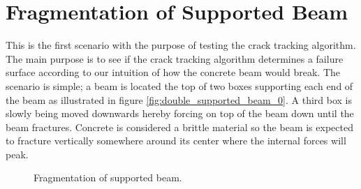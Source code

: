 
\section{Fragmentation of Supported Beam}
This is the first scenario with the purpose of testing the crack tracking
algorithm. The main purpose is to see if the crack tracking algorithm
determines a failure surface according to our intuition of
how the concrete beam would break. The scenario is simple; a beam is
located the top of two boxes supporting each end of the beam as
illustrated in figure \vref{fig:double_supported_beam_0}. A third
box is slowly being moved downwards hereby forcing on top of the beam
down until the beam fractures. Concrete is considered a brittle
material so the beam is expected to fracture vertically somewhere
around its center where the internal forces will peak. 

\begin{figure}
  \begin{minipage}[b]{0.5\linewidth}
    \centering
  \end{minipage}
  \begin{minipage}[b]{0.5\linewidth}
    \centering
  \end{minipage}
\caption{Fragmentation of supported beam.}
\label{fig:double_supported_beam}
\end{figure}

